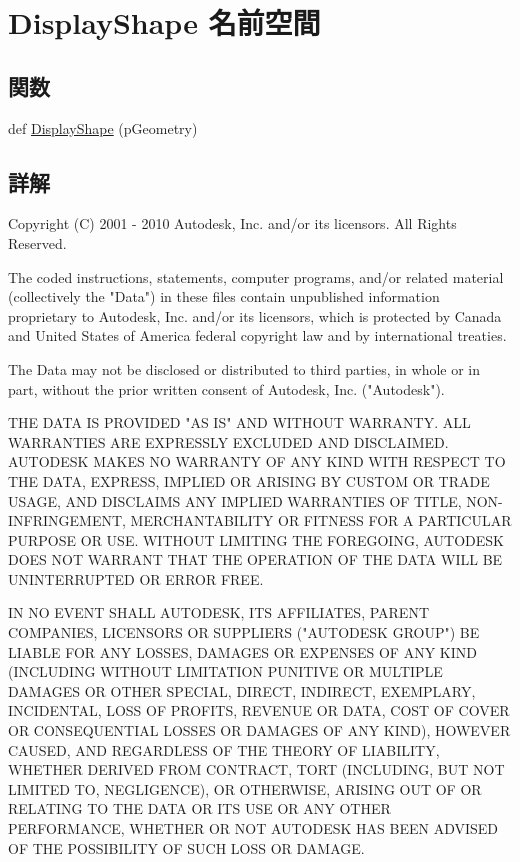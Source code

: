 \hypertarget{namespace_display_shape}{}\section{Display\+Shape 名前空間}
\label{namespace_display_shape}
\subsection*{関数}
\begin{DoxyCompactItemize}
\item 
def \hyperlink{namespace_display_shape_aa2cad22840c44d071824b98fd196f44d}{Display\+Shape} (p\+Geometry)
\end{DoxyCompactItemize}


\subsection{詳解}
\begin{DoxyVerb} Copyright (C) 2001 - 2010 Autodesk, Inc. and/or its licensors.
 All Rights Reserved.

 The coded instructions, statements, computer programs, and/or related material 
 (collectively the "Data") in these files contain unpublished information 
 proprietary to Autodesk, Inc. and/or its licensors, which is protected by 
 Canada and United States of America federal copyright law and by international 
 treaties. 
 
 The Data may not be disclosed or distributed to third parties, in whole or in
 part, without the prior written consent of Autodesk, Inc. ("Autodesk").

 THE DATA IS PROVIDED "AS IS" AND WITHOUT WARRANTY.
 ALL WARRANTIES ARE EXPRESSLY EXCLUDED AND DISCLAIMED. AUTODESK MAKES NO
 WARRANTY OF ANY KIND WITH RESPECT TO THE DATA, EXPRESS, IMPLIED OR ARISING
 BY CUSTOM OR TRADE USAGE, AND DISCLAIMS ANY IMPLIED WARRANTIES OF TITLE, 
 NON-INFRINGEMENT, MERCHANTABILITY OR FITNESS FOR A PARTICULAR PURPOSE OR USE. 
 WITHOUT LIMITING THE FOREGOING, AUTODESK DOES NOT WARRANT THAT THE OPERATION
 OF THE DATA WILL BE UNINTERRUPTED OR ERROR FREE. 
 
 IN NO EVENT SHALL AUTODESK, ITS AFFILIATES, PARENT COMPANIES, LICENSORS
 OR SUPPLIERS ("AUTODESK GROUP") BE LIABLE FOR ANY LOSSES, DAMAGES OR EXPENSES
 OF ANY KIND (INCLUDING WITHOUT LIMITATION PUNITIVE OR MULTIPLE DAMAGES OR OTHER
 SPECIAL, DIRECT, INDIRECT, EXEMPLARY, INCIDENTAL, LOSS OF PROFITS, REVENUE
 OR DATA, COST OF COVER OR CONSEQUENTIAL LOSSES OR DAMAGES OF ANY KIND),
 HOWEVER CAUSED, AND REGARDLESS OF THE THEORY OF LIABILITY, WHETHER DERIVED
 FROM CONTRACT, TORT (INCLUDING, BUT NOT LIMITED TO, NEGLIGENCE), OR OTHERWISE,
 ARISING OUT OF OR RELATING TO THE DATA OR ITS USE OR ANY OTHER PERFORMANCE,
 WHETHER OR NOT AUTODESK HAS BEEN ADVISED OF THE POSSIBILITY OF SUCH LOSS
 OR DAMAGE. \end{DoxyVerb}
 

